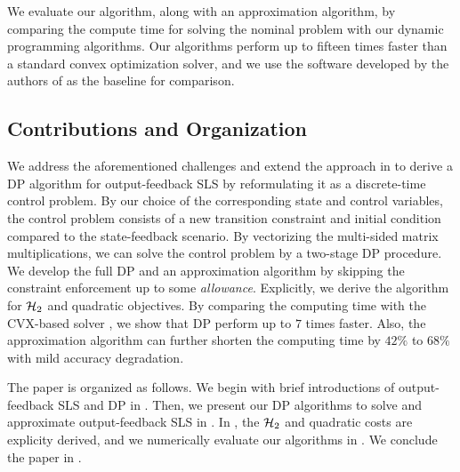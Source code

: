 We evaluate our algorithm, along with an approximation algorithm, by comparing the compute time for 
solving the nominal problem with our dynamic programming algorithms. Our algorithms perform up to fifteen times faster than a standard
convex optimization solver, and we use the software developed by the authors of \cite{SLSpy} as the baseline for comparison.

% 
\fi

\subsection{Contributions and Organization}
We address the aforementioned challenges and extend the approach in \cite{tseng2020system} to derive a DP algorithm for output-feedback SLS by reformulating it as a discrete-time control problem. By our choice of the corresponding state and control variables, the control problem consists of a new transition constraint and initial condition compared to the state-feedback scenario. By vectorizing the multi-sided matrix multiplications, we can solve the control problem by a two-stage DP procedure. We develop the full DP and an approximation algorithm by skipping the constraint enforcement up to some \emph{allowance}. Explicitly, we derive the algorithm for $\mathcal{H}_2$ and quadratic objectives. By comparing the computing time with the CVX-based solver \cite{SLSpy}, we show that DP perform up to $7$ times faster. Also, the approximation algorithm can further shorten the computing time by $42\%$ to $68\%$ with mild accuracy degradation.

The paper is organized as follows. We begin with brief introductions of output-feedback SLS and DP in . 
Then, we present our DP algorithms to solve and approximate output-feedback SLS in . In , 
the $\mathcal{H}_2$ and quadratic costs are explicity derived, and we numerically evaluate our algorithms in . %
We conclude the paper in .

